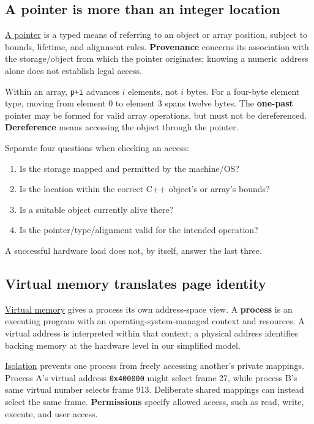 \subsection{A pointer is more than an integer location}\label{05-engine-i-ch002-a-pointer-is-more-than-an-integer-location}

\hyperref[appendix-6af5921bc853]{A pointer} is a typed means of referring to an object or array position, subject to bounds, lifetime, and alignment rules. \textbf{Provenance} concerns its association with the storage/object from which the pointer originates; knowing a numeric address alone does not establish legal access.

Within an array, \texttt{p+i} advances \(i\) elements, not \(i\) bytes. For a four-byte element type, moving from element 0 to element 3 spans twelve bytes. The \textbf{one-past} pointer may be formed for valid array operations, but must not be dereferenced. \textbf{Dereference} means accessing the object through the pointer.

Separate four questions when checking an access:

\begin{enumerate}
\def\labelenumi{\arabic{enumi}.}
\tightlist
\item
  Is the storage mapped and permitted by the machine/OS?
\item
  Is the location within the correct C++ object's or array's bounds?
\item
  Is a suitable object currently alive there?
\item
  Is the pointer/type/alignment valid for the intended operation?
\end{enumerate}

A successful hardware load does not, by itself, answer the last three.

\subsection{Virtual memory translates page identity}\label{05-engine-i-ch002-virtual-memory-translates-page-identity}

\hyperref[appendix-18ee4f913c3c]{Virtual memory} gives a process its own address-space view. A \textbf{process} is an executing program with an operating-system-managed context and resources. A virtual address is interpreted within that context; a physical address identifies backing memory at the hardware level in our simplified model.

\hyperref[appendix-c2a9ad1e2b49]{Isolation} prevents one process from freely accessing another's private mappings. Process A's virtual address \texttt{0x400000} might select frame 27, while process B's same virtual number selects frame 913. Deliberate shared mappings can instead select the same frame. \textbf{Permissions} specify allowed access, such as read, write, execute, and user access.

